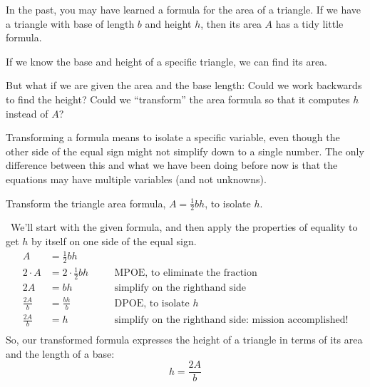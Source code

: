 In the past, you may have learned a formula for the area of a triangle. If we have a triangle with base of length $b$ and height $h$, then its area $A$ has a tidy little formula.
\begin{center}
\end{center}
If we know the base and height of a specific triangle, we can find its area.
\begin{center}
\end{center}
But what if we are given the area and the base length: Could we work backwards to find the height? Could we ``transform'' the area formula so that it computes $h$ instead of $A$?

Transforming a formula means to isolate a specific variable, even though the other side of the equal sign might not simplify down to a single number. The only difference between this and what we have been doing before now is that the equations may have multiple variables (and not unknowns).

\begin{boxex}
Transform the triangle area formula, $A = \frac{1}{2}bh$, to isolate $h$.

\exsoln\ We'll start with the given formula, and then apply the properties of equality to get $h$ by itself on one side of the equal sign.
\[\begin{aligned}
A &= \frac{1}{2}bh \\[1ex]
2 \cdot A &= 2 \cdot \frac{1}{2} bh
&& \quad\text{MPOE, to eliminate the fraction}\\[1ex]
2A &= bh
&& \quad\text{simplify on the righthand side}\\[1ex]
\frac{2 A}{b} &= \frac{bh}{b}
&& \quad\text{DPOE, to isolate $h$}\\[1ex]
\frac{2 A}{b} &= h
&& \quad\text{simplify on the righthand side: mission accomplished!}\\[1ex]
\end{aligned}\]
So, our transformed formula expresses the height of a triangle in terms of its area and the length of a base: \[h = \frac{2A}{b}\]
\end{boxex}

